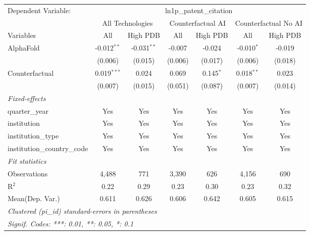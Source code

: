 \begingroup
\centering
\begin{tabular}{lcccccc}
   \tabularnewline \midrule \midrule
   Dependent Variable: & \multicolumn{6}{c}{ln1p\_patent\_citation}\\
 & \multicolumn{2}{c}{All Technologies} & \multicolumn{2}{c}{Counterfactual AI} & \multicolumn{2}{c}{Counterfactual No AI} \\
\cmidrule(lr){1-1}\cmidrule(lr){2-3} \cmidrule(lr){4-5} \cmidrule(lr){6-7}
Variables & \multicolumn{1}{c}{All} & \multicolumn{1}{c}{High PDB} & \multicolumn{1}{c}{All} & \multicolumn{1}{c}{High PDB} & \multicolumn{1}{c}{All} & \multicolumn{1}{c}{High PDB} \\
\cmidrule(lr){1-1}\cmidrule(lr){2-2} \cmidrule(lr){3-3} \cmidrule(lr){4-4} \cmidrule(lr){5-5} \cmidrule(lr){6-6} \cmidrule(lr){7-7}
   AlphaFold                    & -0.012$^{**}$ & -0.031$^{**}$ & -0.007  & -0.024      & -0.010$^{*}$ & -0.019\\   
                                & (0.006)       & (0.015)       & (0.006) & (0.017)     & (0.006)      & (0.018)\\   
   Counterfactual               & 0.019$^{***}$ & 0.024         & 0.069   & 0.145$^{*}$ & 0.018$^{**}$ & 0.023\\   
                                & (0.007)       & (0.015)       & (0.051) & (0.087)     & (0.007)      & (0.014)\\   
   \midrule
   \emph{Fixed-effects}\\
   quarter\_year                & Yes           & Yes           & Yes     & Yes         & Yes          & Yes\\  
   institution                  & Yes           & Yes           & Yes     & Yes         & Yes          & Yes\\  
   institution\_type            & Yes           & Yes           & Yes     & Yes         & Yes          & Yes\\  
   institution\_country\_code   & Yes           & Yes           & Yes     & Yes         & Yes          & Yes\\  
   \midrule
   \emph{Fit statistics}\\
   Observations                 & 4,488         & 771           & 3,390   & 626         & 4,156        & 690\\  
   R$^2$                        & 0.22          & 0.29          & 0.23    & 0.30        & 0.23         & 0.32\\  
Mean(Dep. Var.) & 0.611 & 0.626 & 0.606 & 0.642 & 0.605 & 0.615 \\
   \midrule \midrule
   \multicolumn{7}{l}{\emph{Clustered (pi\_id) standard-errors in parentheses}}\\
   \multicolumn{7}{l}{\emph{Signif. Codes: ***: 0.01, **: 0.05, *: 0.1}}\\
\end{tabular}
\par\endgroup
